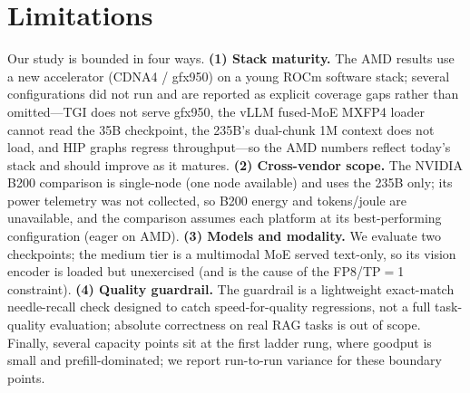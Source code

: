 \section{Limitations}
\label{sec:limitations}

Our study is bounded in four ways. \textbf{(1) Stack maturity.} The AMD results use
a new accelerator (CDNA4 / gfx950) on a young ROCm software stack; several
configurations did not run and are reported as explicit coverage gaps rather than
omitted---TGI does not serve gfx950, the vLLM fused-MoE MXFP4 loader cannot read the
35B checkpoint, the 235B's dual-chunk 1M context does not load, and HIP graphs
regress throughput---so the AMD numbers reflect today's stack and should improve as
it matures. \textbf{(2) Cross-vendor scope.} The NVIDIA B200 comparison is
single-node (one node available) and uses the 235B only; its power telemetry was
not collected, so B200 energy and tokens/joule are unavailable, and the comparison
assumes each platform at its best-performing configuration (eager on AMD).
\textbf{(3) Models and modality.} We evaluate two checkpoints; the medium tier is a
multimodal MoE served text-only, so its vision encoder is loaded but unexercised
(and is the cause of the FP8/TP$=$1 constraint). \textbf{(4) Quality guardrail.} The
guardrail is a lightweight exact-match needle-recall check designed to catch
speed-for-quality regressions, not a full task-quality evaluation; absolute
correctness on real RAG tasks is out of scope. Finally, several capacity points sit
at the first ladder rung, where goodput is small and prefill-dominated; we report
run-to-run variance for these boundary points.
